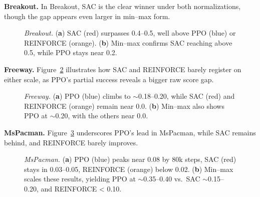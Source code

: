 \medskip

\noindent \textbf{Breakout.} In Breakout, SAC is the clear winner under both normalizations, though the gap appears even larger in min--max form.
\begin{figure} 
	\centering
	\quad
	\caption{\emph{Breakout.}
		(\textbf{a}) SAC (red) surpasses 0.4--0.5, well above PPO (blue) or REINFORCE (orange).
		(\textbf{b}) Min--max confirms SAC reaching above 0.5, while PPO stays near 0.2.}
	\label{fig:breakout_combined}
\end{figure}

\medskip

\noindent \textbf{Freeway.} Figure~\ref{fig:freeway_combined} illustrates how SAC and REINFORCE barely register on either scale, as PPO's partial success reveals a bigger raw score gap.
\begin{figure} 
	\centering
	\quad
	\caption{\emph{Freeway.}
		(\textbf{a}) PPO (blue) climbs to $\sim$\num{0.18}--\num{0.20}, while SAC (red) and REINFORCE (orange) remain near 0.0.
		(\textbf{b}) Min--max also shows PPO at $\sim$\num{0.20}, with the others near 0.0.}
	\label{fig:freeway_combined}
\end{figure}



\medskip

\noindent \textbf{MsPacman.} Figure~\ref{fig:mspacman_combined} underscores PPO's lead in MsPacman, while SAC remains behind, and REINFORCE barely improves.
\begin{figure} 
	\centering
	\quad
	\caption{\emph{MsPacman.}
		(\textbf{a}) PPO (blue) peaks near 0.08 by 80k steps, SAC (red) stays in 0.03--0.05, REINFORCE (orange) below 0.02.
		(\textbf{b}) Min--max scales these results, yielding PPO at $\sim$\num{0.35}--\num{0.40} vs.\ SAC $\sim$\num{0.15}--\num{0.20}, and REINFORCE < 0.10.}
	\label{fig:mspacman_combined}
\end{figure}



